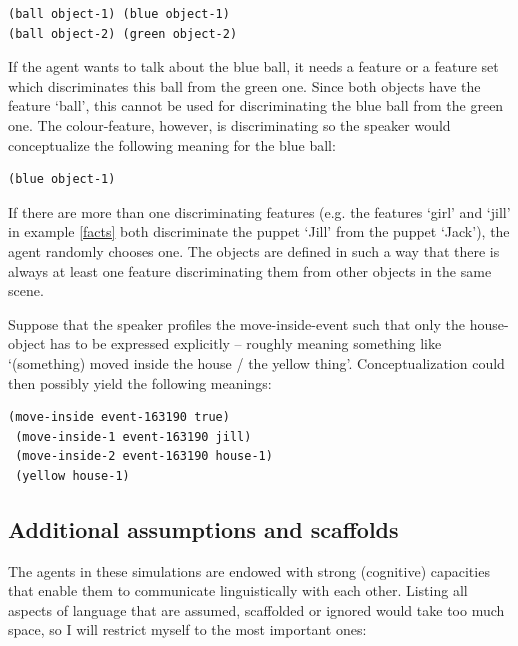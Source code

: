 \ea
\begin{lstlisting}
(ball object-1) (blue object-1)
(ball object-2) (green object-2)
\end{lstlisting}
\z

If the agent wants to talk about the blue ball, it needs a feature or a feature set which discriminates this ball from the green one. Since both objects have the feature `ball', this cannot be used for discriminating the blue ball from the green one. The colour-feature, however, is discriminating so the speaker would conceptualize the following meaning for the blue ball:

\ea
\begin{lstlisting}
(blue object-1)
\end{lstlisting}
\z

If there are more than one discriminating features (e.g. the features `girl' and `jill' in example \ref{facts} both discriminate the puppet `Jill' from the puppet `Jack'), the agent randomly chooses one. The objects are defined in such a way that there is always at least one feature discriminating them from other objects in the same scene.

Suppose that the speaker profiles the move-inside-event such that only the house-object has to be expressed explicitly -- roughly meaning something like `(something) moved inside the house / the yellow thing'. Conceptualization could then possibly yield the following meanings:

\ea
\label{facts3}
\begin{lstlisting} 
(move-inside event-163190 true)
 (move-inside-1 event-163190 jill)
 (move-inside-2 event-163190 house-1)
 (yellow house-1)
\end{lstlisting}
\z

\subsection{Additional assumptions and scaffolds}
\label{s:assumptions}

The agents in these simulations are endowed with strong (cognitive) capacities that enable them to communicate linguistically with each other. Listing all aspects of language that are assumed, scaffolded or ignored would take too much space, so I will restrict myself to the most important ones:

